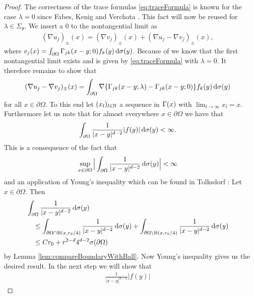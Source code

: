 \begin{proof}
  The correctness of the trace formulas \eqref{eq:traceFormula} is known for the case $\lambda = 0$ since Fabes, Kenig and Verchota \cite{fabesKenigVerchota}.
  This fact will now be reused for $\lambda \in \Sigma_\theta$.
  We insert a $0$ to the nontangential limit as
  \begin{align*}
    (\nabla u_j)_\pm(x) = 
    (\nabla v_j)_\pm(x) + (\nabla u_j - \nabla v_j)_\pm(x),
  \end{align*}
  where $v_j(x) = \int_{\partial\Omega} \Gamma_{jk}(x - y; 0) f_k(y) \, {\operatorname{d}\!{\sigma}}(y)$.
  Because of \cite{fabesKenigVerchota} we know that the first nontangential limit exists and is given by \eqref{eq:traceFormula} with $\lambda = 0$.
  It therefore remains to show that
  \begin{align*}
    (\nabla u_j - \nabla v_j)_\pm(x) = \int_{\partial\Omega} \nabla \{ \Gamma_{jk}(x - y; \lambda) - \Gamma_{jk}(x - y; 0) \} f_k(y) \, {\operatorname{d}\!{\sigma}}(y)
  \end{align*}
  for all $x \in \partial \Omega$.
  To this end let $(x_l)_{l \in \mathbb{N}}$ a sequence in $\Gamma(x)$ with $\lim_{l \to \infty} x_l = x$.
  Furthermore let us note that for almost everywhere $x \in \partial\Omega$ we have that 
  \begin{align*}
    \int_{\partial\Omega} \frac{1}{|x - y|^{d - 2}} |f(y)| \, {\operatorname{d}\!{\sigma}}(y) < \infty.
  \end{align*}
  This is a consequence of the fact that
  \begin{align*}
    \sup_{x \in \partial\Omega} \Big| \int_{\partial\Omega} \frac{1}{|x - y|^{d - 2}} \, {\operatorname{d}\!{\sigma}}(y) \Big| < \infty
  \end{align*}
  and an application of Young's inequality which can be found in Tolksdorf \cite{tolksdorfDiss}:
  Let $x \in \partial\Omega$.
  Then
  \begin{align*}
    &\int_{\partial\Omega} \frac{1}{|x - y|^{d - 2}} \, {\operatorname{d}\!{\sigma}}(y) \\
    &\quad\leq \int_{\partial\Omega \cap \mathrm{B}(x,r_0/4)} \frac{1}{|x - y|^{d - 2}} \, {\operatorname{d}\!{\sigma}}(y) + \int_{\partial\Omega \setminus \mathrm{B}(x, r_0/4)} \frac{1}{|x - y|^{d - 2}} \, {\operatorname{d}\!{\sigma}}(y) \\
    &\quad\leq C r_0 + r^{2 - d} 4^{d - 2} \sigma(\partial\Omega)
  \end{align*}
  by Lemma \ref{lem:compareBoundaryWithBall}.
  Now Young's inequality gives us the desired result.
  In the next step we will show that
  \begin{align*}
    \frac{1}{|x -y|^{d - 2}} |f(y)|

\end{align*}
\end{proof}
